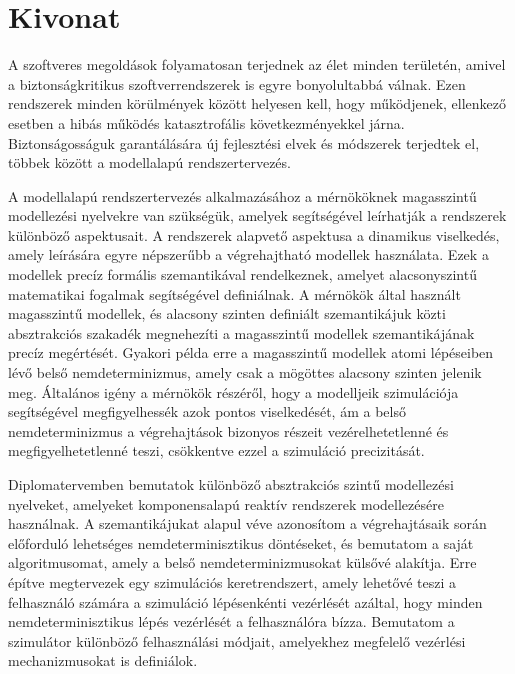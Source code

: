 \setcounter{page}{1}

\selecthungarian

\chapter*{Kivonat}

A szoftveres megoldások folyamatosan terjednek az élet minden területén, amivel a biztonságkritikus szoftverrendszerek is egyre bonyolultabbá válnak. Ezen rendszerek minden körülmények között helyesen kell, hogy működjenek, ellenkező esetben a hibás működés katasztrofális következményekkel járna. Biztonságosságuk garantálására új fejlesztési elvek és módszerek terjedtek el, többek között a modellalapú rendszertervezés.

A modellalapú rendszertervezés alkalmazásához a mérnököknek magasszintű modellezési nyelvekre van szükségük, amelyek segítségével leírhatják a rendszerek különböző aspektusait. A rendszerek alapvető aspektusa a dinamikus viselkedés, amely leírására egyre népszerűbb a végrehajtható modellek használata. Ezek a modellek precíz formális szemantikával rendelkeznek, amelyet alacsonyszintű matematikai fogalmak segítségével definiálnak. A mérnökök által használt magasszintű modellek, és alacsony szinten definiált szemantikájuk közti absztrakciós szakadék megnehezíti a magasszintű modellek szemantikájának precíz megértését. Gyakori példa erre a magasszintű modellek atomi lépéseiben lévő belső nemdeterminizmus, amely csak a mögöttes alacsony szinten jelenik meg. Általános igény a mérnökök részéről, hogy a modelljeik szimulációja segítségével megfigyelhessék azok pontos viselkedését, ám a belső nemdeterminizmus a végrehajtások bizonyos részeit vezérelhetetlenné és megfigyelhetetlenné teszi, csökkentve ezzel a szimuláció precizitását.

Diplomatervemben bemutatok különböző absztrakciós szintű modellezési nyelveket, amelyeket komponensalapú reaktív rendszerek modellezésére használnak. A szemantikájukat alapul véve azonosítom a végrehajtásaik során előforduló lehetséges nemdeterminisztikus döntéseket, és bemutatom a saját algoritmusomat, amely a belső nemdeterminizmusokat külsővé alakítja. Erre építve megtervezek egy szimulációs keretrendszert, amely lehetővé teszi a felhasználó számára a szimuláció lépésenkénti vezérlését azáltal, hogy minden nemdeterminisztikus lépés vezérlését a felhasználóra bízza. Bemutatom a szimulátor különböző felhasználási módjait, amelyekhez megfelelő vezérlési mechanizmusokat is definiálok.

